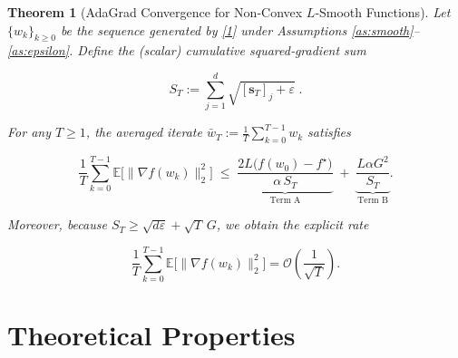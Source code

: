 \documentclass{article}
\newtheorem{theorem}{Theorem}
\begin{document}
\begin{theorem}[AdaGrad Convergence for Non‑Convex $L$‑Smooth Functions]\label{thm:main}
Let $\{w_k\}_{k\ge 0}$ be the sequence generated by \eqref{1} under Assumptions \ref{as:smooth}–\ref{as:epsilon}.  
Define the (scalar) cumulative squared‑gradient sum  

\[
S_T:=\sum_{j=1}^{d}\sqrt{[\mathbf{s}_{T}]_j+\varepsilon}\; .
\]

For any $T\ge 1$, the averaged iterate $\bar w_T:=\frac1T\sum_{k=0}^{T-1}w_k$ satisfies  

\[
\frac{1}{T}\sum_{k=0}^{T-1}\mathbb{E}\!\bigl[\|\nabla f(w_k)\|_2^{2}\bigr]
   \;\le\;
   \underbrace{\frac{2L\bigl(f(w_0)-f^{\star}\bigr)}{\alpha\,S_T}}_{\text{Term A}}
   \;+\;
   \underbrace{\frac{L\alpha G^{2}}{S_T}}_{\text{Term B}} .
\tag{2}
\]

Moreover, because $S_T\ge \sqrt{d\varepsilon}+ \sqrt{T}\,G$, we obtain the explicit rate  

\[
\frac{1}{T}\sum_{k=0}^{T-1}\mathbb{E}\!\bigl[\|\nabla f(w_k)\|_2^{2}\bigr]
   =\mathcal{O}\!\left(\frac{1}{\sqrt{T}}\right).
\tag{3}
\]
\end{theorem}

\section*{Theoretical Properties}
\end{document}
